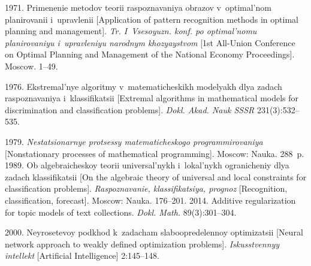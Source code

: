 





 \begin{multicols}{2}

\renewcommand{\bibname}{\protect\rmfamily References}

{\small\frenchspacing
 {%
 \begin{thebibliography}{99}

1971. Primenenie metodov teorii ras\-po\-zna\-va\-niya obrazov v~optimal'nom 
planirovanii i~uprav\-le\-nii [Application of pattern recognition methods 
in optimal planning and management]. 
\textit{Tr. I~Vsesoyuzn. konf. po optimal'nomu planirovaniyu i~upravleniyu 
narodnym khozyaystvom} [1st All-Union Conference on 
Optimal Planning and Management of the National Economy Proceedings]. Moscow. 1--49.

 1976. Ekstremal'nye algoritmy v~ma\-te\-ma\-ti\-che\-skikh 
modelyakh dlya zadach raspoznavaniya i~klassifikatsii 
[Extremal algorithms in mathematical models for discrimination and 
classification problems]. \textit{Dokl. Akad. Nauk SSSR} 231(3):532--535.

1979. \textit{Ne\-sta\-tsi\-o\-nar\-nye protsessy matematicheskogo programmirovaniya} 
[Nonstationary processes of mathematical programming]. Moscow: Nauka. 288~p.
 1989. Ob algebraicheskoy teorii universal'nykh i~lokal'nykh ogranicheniy 
 dlya zadach klassifikatsii [On the algebraic theory of universal and 
 local constraints for classification problems]. 
 \textit{Raspoznavanie, klassifikatsiya, prognoz} [Recognition,
  classification, forecast]. Moscow: Nauka. 176--201.
 2014. 
Additive regularization for topic models of text collections. 
\textit{Dokl. Math.} 89(3):301--304.

 2000. Neyrosetevoy podkhod k~zadacham slaboopredelennoy 
optimizatsii [Neural network approach to weakly defined optimization problems].
\textit{Iskusstvennyy intellekt} [Artificial Intelligence] 2:145--148.


\end{thebibliography}}}
\end{multicols}
